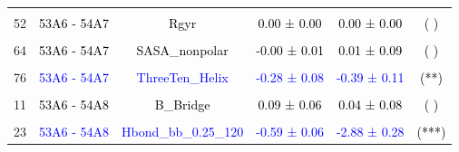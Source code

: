 \documentclass{article}\usepackage[table]{xcolor}
\renewcommand{\$}{$} %
\begin{document}
\begin{center}
\begin{longtable}[t]{lccccc}
\cellcolor{gray!6}{46} & \cellcolor{gray!6}{\textcolor{black}{53A6 - 54A7}} & \cellcolor{gray!6}{\textcolor{black}{Pi\_Helix}} & \cellcolor{gray!6}{\textcolor{black}{0.17 ± 0.11}} & \cellcolor{gray!6}{\textcolor{black}{0.22 ± 0.13}} & \cellcolor{gray!6}{\textcolor{black}{( )}}\\
52 & \textcolor{black}{53A6 - 54A7} & \textcolor{black}{Rgyr} & \textcolor{black}{0.00 ± 0.00} & \textcolor{black}{0.00 ± 0.00} & \textcolor{black}{( )}\\
\cellcolor{gray!6}{58} & \cellcolor{gray!6}{\textcolor{blue}{53A6 - 54A7}} & \cellcolor{gray!6}{\textcolor{blue}{RMSD.ADJ}} & \cellcolor{gray!6}{\textcolor{blue}{0.39 ± 0.08}} & \cellcolor{gray!6}{\textcolor{blue}{0.03 ± 0.01}} & \cellcolor{gray!6}{\textcolor{black}{(***)}}\\
64 & \textcolor{black}{53A6 - 54A7} & \textcolor{black}{SASA\_nonpolar} & \textcolor{black}{-0.00 ± 0.01} & \textcolor{black}{0.01 ± 0.09} & \textcolor{black}{( )}\\
\cellcolor{gray!6}{70} & \cellcolor{gray!6}{\textcolor{black}{53A6 - 54A7}} & \cellcolor{gray!6}{\textcolor{black}{SASA\_polar}} & \cellcolor{gray!6}{\textcolor{black}{0.02 ± 0.01}} & \cellcolor{gray!6}{\textcolor{black}{0.22 ± 0.12}} & \cellcolor{gray!6}{\textcolor{black}{( )}}\\
76 & \textcolor{blue}{53A6 - 54A7} & \textcolor{blue}{ThreeTen\_Helix} & \textcolor{blue}{-0.28 ± 0.08} & \textcolor{blue}{-0.39 ± 0.11} & \textcolor{black}{(**)}\\
\cellcolor{gray!6}{5} & \cellcolor{gray!6}{\textcolor{blue}{53A6 - 54A8}} & \cellcolor{gray!6}{\textcolor{blue}{A\_Helix}} & \cellcolor{gray!6}{\textcolor{blue}{-0.43 ± 0.08}} & \cellcolor{gray!6}{\textcolor{blue}{-1.94 ± 0.29}} & \cellcolor{gray!6}{\textcolor{black}{(***)}}\\
11 & \textcolor{black}{53A6 - 54A8} & \textcolor{black}{B\_Bridge} & \textcolor{black}{0.09 ± 0.06} & \textcolor{black}{0.04 ± 0.08} & \textcolor{black}{( )}\\
\cellcolor{gray!6}{17} & \cellcolor{gray!6}{\textcolor{blue}{53A6 - 54A8}} & \cellcolor{gray!6}{\textcolor{blue}{B\_Strand}} & \cellcolor{gray!6}{\textcolor{blue}{0.58 ± 0.08}} & \cellcolor{gray!6}{\textcolor{blue}{1.31 ± 0.20}} & \cellcolor{gray!6}{\textcolor{black}{(***)}}\\
23 & \textcolor{blue}{53A6 - 54A8} & \textcolor{blue}{Hbond\_bb\_0.25\_120} & \textcolor{blue}{-0.59 ± 0.06} & \textcolor{blue}{-2.88 ± 0.28} & \textcolor{black}{(***)}\\

\end{longtable}
\end{center}
\end{document}
